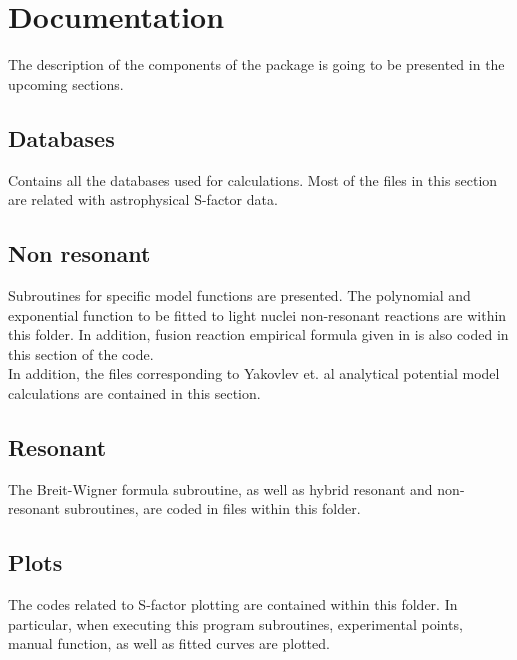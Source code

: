 \documentclass[openany]{book}
\begin{document}
\section{Documentation} \label{sec:documentation}

The description of the components of the package is going to be presented in the upcoming sections.


\subsection{Databases} \label{sub:codesDatabases}

Contains all the databases used for calculations. Most of the files in this section are related with astrophysical S-factor data. 

\subsection{Non resonant} \label{sub:codesNonResonant}

Subroutines for specific model functions are presented. The polynomial and exponential function to be fitted to light nuclei non-resonant reactions are within this folder. In addition, fusion reaction empirical formula given in \cite{beard_afanasjev_chamon_gasques_wiescher_yakovlev_2010} is also coded in this section of the code.  \\

In addition, the files corresponding to Yakovlev et. al analytical potential model \cite{yakovlev_beard_gasques_wiescher_2010} calculations are contained in this section. 

\subsection{Resonant} \label{sub:codesResonant}

The Breit-Wigner formula subroutine, as well as hybrid resonant and non-resonant subroutines, are coded in files within this folder.

\subsection{Plots} \label{sub:codesPlots}

The codes related to S-factor plotting are contained within this folder. In particular, when executing this program subroutines, experimental points, manual function, as well as fitted curves are plotted.
\end{document}
